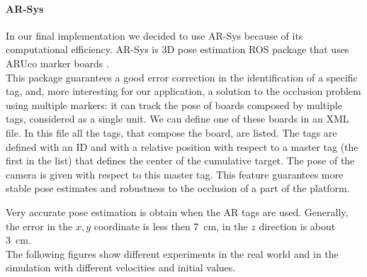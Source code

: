 \paragraph{AR-Sys}
In our final implementation we decided to use AR-Sys because of its computational efficiency. AR-Sys is 3D pose estimation ROS package that uses ARUco marker boards \cite{Aruco2014}.\\
This package guarantees a good error correction in the identification of a specific tag, and, more interesting for our application, a solution to the occlusion problem using multiple markers: it can track the pose of boards composed by multiple tags, considered as a single unit. We can define one of these boards in an XML file. In this file all the tags, that compose the board, are listed. The tags are defined with an ID and with a relative position with respect to a master tag (the first in the list) that defines the center of the cumulative target.
The pose of the camera is given with respect to this master tag. This feature guarantees more stable pose estimates and robustness to the occlusion of a part of the platform.

Very accurate pose estimation is obtain when the AR tags are used. Generally, the error in the $x,y$ coordinate is less then \SI{7}{\centi \meter}, in the $z$ direction is about \SI{3}{\centi \meter}.\\
The following figures show different experiments in the real world and in the simulation with different velocities and initial values.\\

